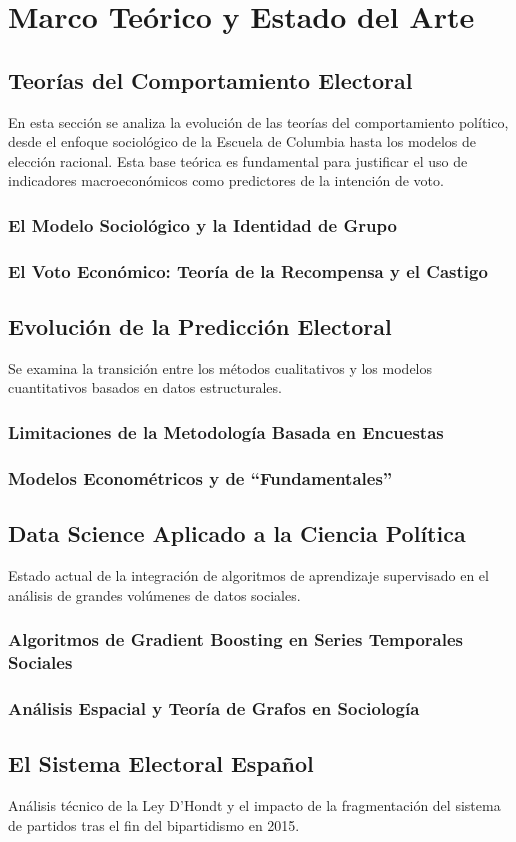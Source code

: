 \chapter{Marco Teórico y Estado del Arte}

\section{Teorías del Comportamiento Electoral}
En esta sección se analiza la evolución de las teorías del comportamiento político, desde el enfoque sociológico de la Escuela de Columbia hasta los modelos de elección racional. Esta base teórica es fundamental para justificar el uso de indicadores macroeconómicos como predictores de la intención de voto.

\subsection{El Modelo Sociológico y la Identidad de Grupo}
\subsection{El Voto Económico: Teoría de la Recompensa y el Castigo}

\section{Evolución de la Predicción Electoral}
Se examina la transición entre los métodos cualitativos y los modelos cuantitativos basados en datos estructurales.

\subsection{Limitaciones de la Metodología Basada en Encuestas}
\subsection{Modelos Econométricos y de ``Fundamentales''}

\section{Data Science Aplicado a la Ciencia Política}
Estado actual de la integración de algoritmos de aprendizaje supervisado en el análisis de grandes volúmenes de datos sociales.

\subsection{Algoritmos de Gradient Boosting en Series Temporales Sociales}
\subsection{Análisis Espacial y Teoría de Grafos en Sociología}

\section{El Sistema Electoral Español}
Análisis técnico de la Ley D'Hondt y el impacto de la fragmentación del sistema de partidos tras el fin del bipartidismo en 2015.
